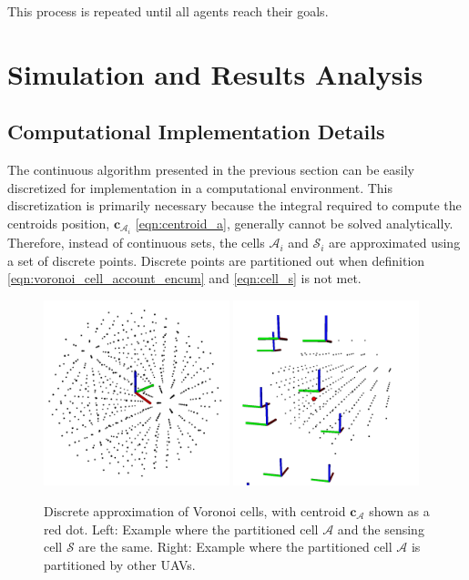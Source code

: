         This process is repeated until all agents reach their goals.


\section{Simulation and Results Analysis}

    \subsection{Computational Implementation Details}
        The continuous algorithm presented in the previous section can be easily discretized for implementation in a computational environment.
        This discretization is primarily necessary because the integral required to compute the centroids position, $\mathbf{c}_{\mathcal{A}_i}$ \eqref{eqn:centroid_a}, generally cannot be solved analytically.
        Therefore, instead of continuous sets, the cells $\mathcal{A}_i$ and  $\mathcal{S}_i$ are approximated using a set of discrete points.
        Discrete points are partitioned out when definition \eqref{eqn:voronoi_cell_account_encum} and \eqref{eqn:cell_s} is not met.
        \begin{figure}[htbp]
            \centering
            \includegraphics[width=0.48\textwidth, height=0.48\textwidth]{./fig/rviz/cs_equal_ca.png}
            \includegraphics[width=0.48\textwidth, height=0.48\textwidth]{./fig/rviz/ca_partitioned.png}
            \caption{
                Discrete approximation of Voronoi cells, with centroid $\mathbf{c}_{\mathcal{A}}$ shown as a red dot. Left: Example where the partitioned cell $\mathcal{A}$ and the sensing cell $\mathcal{S}$ are the same. Right: Example where the partitioned cell $\mathcal{A}$ is partitioned by other \ac{UAV}s.
            }
            \label{fig:rviz_cells}
        \end{figure}
        

